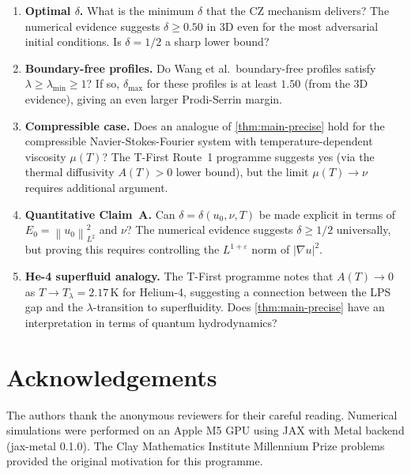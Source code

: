 \documentclass[12pt]{article}
\theoremstyle{plain}
\theoremstyle{definition}
\theoremstyle{remark}
\newcommand{\norm}[1]{\left\|#1\right\|}
\newcommand{\abs}[1]{\left|#1\right|}
\newcommand{\eps}{\varepsilon}
\newcommand{\grad}{\nabla}
\begin{document}
\begin{enumerate}[label=\textbf{Q\arabic*.}, leftmargin=3em]

\item \textbf{Optimal $\delta$.}
  What is the minimum $\delta$ that the CZ mechanism delivers?
  The numerical evidence suggests $\delta\geq 0.50$ in 3D even for the
  most adversarial initial conditions.
  Is $\delta=1/2$ a sharp lower bound?

\item \textbf{Boundary-free profiles.}
  Do Wang et al.\ boundary-free profiles satisfy $\lambda\geq\lambda_{\min}\geq 1$?
  If so, $\delta_{\max}$ for these profiles is at least $1.50$ (from the 3D evidence),
  giving an even larger Prodi-Serrin margin.

\item \textbf{Compressible case.}
  Does an analogue of \cref{thm:main-precise} hold for the compressible
  Navier-Stokes-Fourier system with temperature-dependent viscosity
  $\mu(T)$? The T-First Route~1 programme suggests yes
  (via the thermal diffusivity $A(T)>0$ lower bound), but the limit
  $\mu(T)\to\nu$ requires additional argument.

\item \textbf{Quantitative Claim~A.}
  Can $\delta=\delta(u_0,\nu,T)$ be made explicit in terms of $E_0=\norm{u_0}_{L^2}^2$
  and $\nu$?
  The numerical evidence suggests $\delta\geq 1/2$ universally,
  but proving this requires controlling the $L^{1+\eps}$ norm of $\abs{\grad u}^2$.

\item \textbf{He-4 superfluid analogy.}
  The T-First programme notes that $A(T)\to 0$ as $T\to T_\lambda=2.17\,\mathrm{K}$
  for Helium-4, suggesting a connection between the LPS gap and the
  $\lambda$-transition to superfluidity.
  Does \cref{thm:main-precise} have an interpretation in terms of quantum
  hydrodynamics?

\end{enumerate}

\section*{Acknowledgements}

The authors thank the anonymous reviewers for their careful reading.
Numerical simulations were performed on an Apple M5 GPU using
JAX with Metal backend (jax-metal 0.1.0).
The Clay Mathematics Institute Millennium Prize problems \cite{Fefferman2000}
provided the original motivation for this programme.
\end{document}
